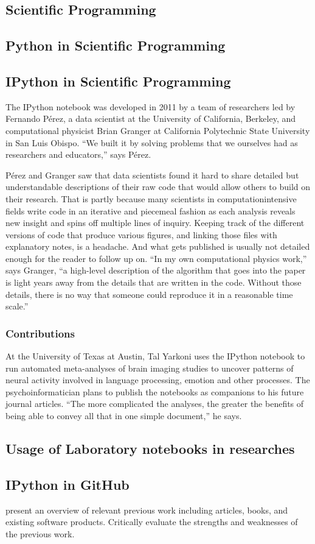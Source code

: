 \subsection{Scientific Programming}
\subsection{Python in Scientific Programming}
\subsection{IPython in Scientific Programming}

The IPython notebook was developed in 2011
by a team of researchers led by Fernando Pérez,
a data scientist at the University of California,
Berkeley, and computational physicist Brian
Granger at California Polytechnic State University
in San Luis Obispo. “We built it by solving
problems that we ourselves had as researchers
and educators,” says Pérez.

Pérez and Granger saw that data scientists
found it hard to share detailed but understandable
descriptions of their raw code that would
allow others to build on their research. That is
partly because many scientists in computationintensive
fields write code in an iterative and
piecemeal fashion as each analysis reveals new
insight and spins off multiple lines of inquiry.
Keeping track of the different versions of code
that produce various figures, and linking those
files with explanatory notes, is a headache.
And what gets published is usually not detailed
enough for the reader to follow up on. “In my
own computational physics work,” says Granger,
“a high-level description of the algorithm that
goes into the paper is light years away from
the details that are written in the code. Without
those details, there is no way that someone
could reproduce it in a reasonable time scale.”

\subsubsection{Contributions}

At the University of Texas at Austin, Tal Yarkoni
uses the IPython notebook to run automated
meta-analyses of brain imaging studies to
uncover patterns of neural activity involved in
language processing, emotion and other processes.
The psychoinformatician plans to publish
the notebooks as companions to his future
journal articles. “The more complicated the
analyses, the greater the benefits of being able to convey all that in one simple document,” he says.
\cite{shen2014interactive}

\subsection{Usage of Laboratory notebooks in researches}
\subsection{IPython in GitHub}
present an overview of relevant previous work including articles, books, and existing software products. Critically evaluate the strengths and weaknesses of the previous work.